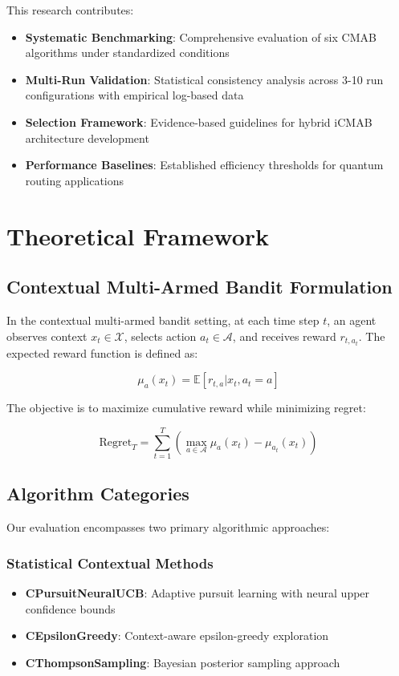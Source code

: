 \documentclass[12pt,a4paper]{article}
\begin{document}
This research contributes:

\begin{itemize}
\item \textbf{Systematic Benchmarking}: Comprehensive evaluation of six CMAB algorithms under standardized conditions
\item \textbf{Multi-Run Validation}: Statistical consistency analysis across 3-10 run configurations with empirical log-based data
\item \textbf{Selection Framework}: Evidence-based guidelines for hybrid iCMAB architecture development
\item \textbf{Performance Baselines}: Established efficiency thresholds for quantum routing applications
\end{itemize}

\section{Theoretical Framework}

\subsection{Contextual Multi-Armed Bandit Formulation}

In the contextual multi-armed bandit setting, at each time step $t$, an agent observes context $x_t \in \mathcal{X}$, selects action $a_t \in \mathcal{A}$, and receives reward $r_{t,a_t}$. The expected reward function is defined as:

\begin{equation}
\mu_a(x_t) = \mathbb{E}[r_{t,a} | x_t, a_t = a]
\end{equation}

The objective is to maximize cumulative reward while minimizing regret:

\begin{equation}
\text{Regret}_T = \sum_{t=1}^{T} \left(\max_{a \in \mathcal{A}} \mu_a(x_t) - \mu_{a_t}(x_t)\right)
\end{equation}

\subsection{Algorithm Categories}

Our evaluation encompasses two primary algorithmic approaches:

\subsubsection{Statistical Contextual Methods}
\begin{itemize}
\item \textbf{CPursuitNeuralUCB}: Adaptive pursuit learning with neural upper confidence bounds
\item \textbf{CEpsilonGreedy}: Context-aware epsilon-greedy exploration
\item \textbf{CThompsonSampling}: Bayesian posterior sampling approach
\end{itemize}
\end{document}
